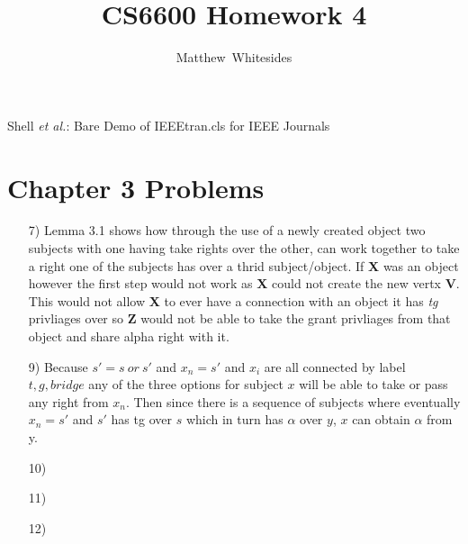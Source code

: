 \documentclass[journal,onecolumn]{IEEEtran}
\begin{document}
%
\title{CS6600 Homework 4}

%
%
%
\author{Matthew~Whitesides}%

%
{Shell \MakeLowercase{\textit{et al.}}: Bare Demo of IEEEtran.cls for IEEE Journals}

\maketitle


\IEEEpeerreviewmaketitle

\section{Chapter 3 Problems}

\begin{enumerate}
  \item [7)] Lemma 3.1 shows how through the use of a newly created object two subjects with one having take rights over the other, can work together to take a right one of the subjects has over a thrid subject/object. If \textbf{X} was an object however the first step would not work as \textbf{X} could not create the new vertx \textbf{V}. This would not allow \textbf{X} to ever have a connection with an object it has \textit{tg} privliages over so \textbf{Z} would not be able to take the grant privliages from that object and share alpha right with it. 
  \item [9)] Because \(s' = s\:or\:s'\) and \(x_n = s'\) and \(x_i\) are all connected by label \(t,g,bridge\) any of the three options for subject \(x\) will be able to take or pass any right from \(x_n\). Then since there is a sequence of subjects where eventually \(x_n = s'\) and \(s'\) has tg over \(s\) which in turn has \(\alpha\) over \(y\), \(x\) can obtain \(\alpha\) from y. 
  \item [10)]
  \item [11)]
  \item [12)]
\end{enumerate}
\end{document}

